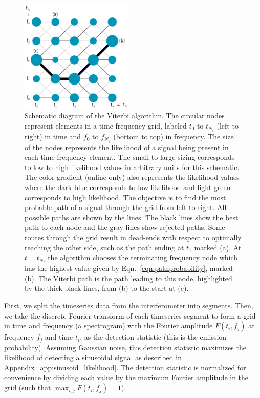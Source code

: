 \documentclass[paper-main.tex]{subfiles}
\begin{document}
\begin{figure}
\begin{center}
\includegraphics[width=0.48\textwidth]{figures/viterbiDiagramSizes.pdf}
\caption{\label{fig:viterbi}
Schematic diagram of the Viterbi algorithm. 
The circular nodes represent elements in a time-frequency grid, labeled $t_0$ to $t_{N_t}$ (left to right) in time and $f_0$ to $f_{N_f}$ (bottom to top) in frequency. 
The size of the nodes represents the likelihood of a signal being present in each time-frequency element. 
The small to large sizing corresponds to low to high likelihood values in arbitrary units for this schematic. 
The color gradient (online only) also represents the likelihood values where the dark blue corresponds to low likelihood and light green corresponds to high likelihood. 
The objective is to find the most probable path of a signal through the grid from left to right.
All possible paths are shown by the lines. 
The black lines show the best path to each node and the gray lines show rejected paths. 
Some routes through the grid result in dead-ends with respect to optimally reaching the other side, such as the path ending at $t_1$ marked (a).
At $t=t_{N_t}$ the algorithm chooses the terminating frequency node which has the highest value given by Eqn.~\ref{eqn:pathprobability}, marked (b). 
The Viterbi path is the path leading to this node, highlighted by the thick-black lines, from (b) to the start at (c). 
}
\end{center}
\end{figure}




First, we split the timeseries data from the interferometer into segments. 
Then, we take the discrete Fourier transform of each timeseries segment to form a grid in time and frequency (a spectrogram) with the Fourier amplitude $F(t_i,f_j)$ at frequency $f_j$ and time $t_i$, as the detection statistic (this is the emission probability).
Assuming Gaussian noise, this detection statistic maximizes the likelihood of detecting a sinusoidal signal as described in Appendix~\ref{app:sinusoid_likelihood}.
The detection statistic is normalized for convenience by dividing each value by the maximum Fourier amplitude in the grid (such that $\max_{i,j} F(t_i,f_j) = 1$).
\end{document}
